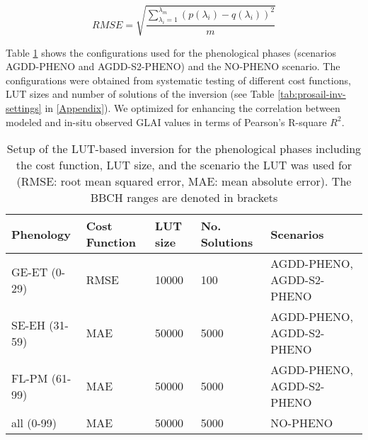 \begin{equation}
    RMSE = \sqrt{\frac{\sum_{\lambda_i = 1}^{\lambda_m}(p(\lambda_i) - q(\lambda_i))^2}{m}}
\end{equation}

Table \ref{tab:inv-setup} shows the configurations used for the phenological phases (scenarios AGDD-PHENO and AGDD-S2-PHENO) and the NO-PHENO scenario. The configurations were obtained from systematic testing of different cost functions, LUT sizes and number of solutions of the inversion (see Table \ref{tab:prosail-inv-settings} in \ref{Appendix}). We optimized for enhancing the correlation between modeled and in-situ observed GLAI values in terms of Pearson's R-square $R^2$.

\begin{table}[H]
\caption{Setup of the LUT-based inversion for the phenological phases including the cost function, LUT size, and the scenario the LUT was used for (RMSE: root mean squared error, MAE: mean absolute error). The BBCH ranges are denoted in brackets}
\label{tab:inv-setup}
\begin{tabularx}{\textwidth}{p{4cm}p{1.8cm}p{1.8cm}p{1.8cm}p{2.8cm}}
\toprule
\textbf{Phenology} & \textbf{Cost Function} & \textbf{LUT size} & \textbf{No. Solutions}  & \textbf{Scenarios}\\ \midrule
GE-ET (0-29)                 & RMSE          & 10000              & 100        & AGDD-PHENO, AGDD-S2-PHENO         \\
SE-EH (31-59)                & MAE           & 50000              & 5000   & AGDD-PHENO, AGDD-S2-PHENO             \\
FL-PM (61-99)                & MAE           & 50000              & 5000    & AGDD-PHENO, AGDD-S2-PHENO            \\
all (0-99)                 & MAE           & 50000              & 5000     & NO-PHENO           \\ \bottomrule
\end{tabularx}
\end{table}

